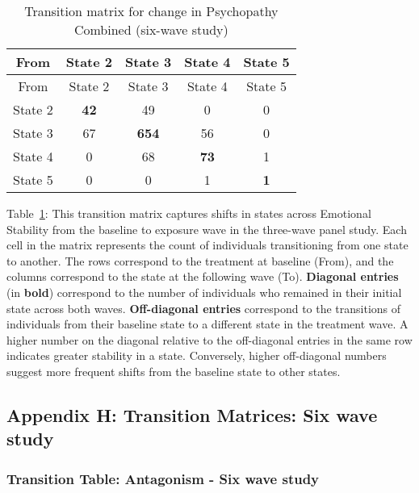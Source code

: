 \documentclass[
  single column]{article}
\begin{document}
\begin{longtable}[]{@{}ccccc@{}}
\caption{Transition matrix for change in Psychopathy Combined (six-wave
study)}\label{tbl-table-transition-psychopathy-combined}\tabularnewline
\toprule\noalign{}
From & State 2 & State 3 & State 4 & State 5 \\
\midrule\noalign{}
\endfirsthead
\toprule\noalign{}
From & State 2 & State 3 & State 4 & State 5 \\
\midrule\noalign{}
\endhead
\bottomrule\noalign{}
\endlastfoot
State 2 & \textbf{42} & 49 & 0 & 0 \\
State 3 & 67 & \textbf{654} & 56 & 0 \\
State 4 & 0 & 68 & \textbf{73} & 1 \\
State 5 & 0 & 0 & 1 & \textbf{1} \\
\end{longtable}

Table~\ref{tbl-table-transition-psychopathy-combined}: This transition
matrix captures shifts in states across Emotional Stability from the
baseline to exposure wave in the three-wave panel study. Each cell in
the matrix represents the count of individuals transitioning from one
state to another. The rows correspond to the treatment at baseline
(From), and the columns correspond to the state at the following wave
(To). \textbf{Diagonal entries} (in \textbf{bold}) correspond to the
number of individuals who remained in their initial state across both
waves. \textbf{Off-diagonal entries} correspond to the transitions of
individuals from their baseline state to a different state in the
treatment wave. A higher number on the diagonal relative to the
off-diagonal entries in the same row indicates greater stability in a
state. Conversely, higher off-diagonal numbers suggest more frequent
shifts from the baseline state to other states.

\subsection{Appendix H: Transition Matrices: Six wave
study}\label{appendix-h-transition-matrices-six-wave-study}

\subsubsection{Transition Table: Antagonism - Six wave
study}\label{transition-table-antagonism---six-wave-study}
\end{document}
